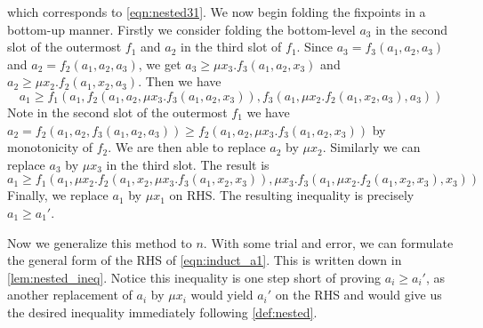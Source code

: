 which corresponds to \autoref{eqn:nested31}. We now begin folding the fixpoints in a bottom-up manner. Firstly we consider folding the bottom-level $a_3$ in the second slot of the outermost $f_1$ and $a_2$ in the third slot of $f_1$. Since $a_3 = f_3(a_1,a_2,a_3)$ and $a_2=f_2(a_1,a_2,a_3)$, we get $a_3 \geq \mu x_3. f_3(a_1,a_2,x_3)$ and $a_2\geq \mu x_2.f_2(a_1,x_2,a_3)$. Then we have
\begin{equation*}
    a_1 \geq f_1(a_1,f_2(a_1,a_2,\mu x_3.f_3(a_1,a_2,x_3)), f_3(a_1,\mu x_2.f_2(a_1,x_2,a_3),a_3))
\end{equation*}
Note in the second slot of the outermost $f_1$ we have $a_2 = f_2(a_1,a_2,f_3(a_1,a_2,a_3)) \geq f_2(a_1,a_2,\mu x_3.f_3(a_1,a_2,x_3))$ by monotonicity of $f_2$. We are then able to replace $a_2$ by $\mu x_2$. Similarly we can replace $a_3$ by $\mu x_3$ in the third slot. The result is
\begin{equation}
    \label{eqn:induct_a1}
    a_1 \geq f_1(a_1,\mu x_2.f_2(a_1,x_2,\mu x_3.f_3(a_1,x_2,x_3)), \mu x_3.f_3(a_1,\mu x_2.f_2(a_1,x_2,x_3),x_3))
\end{equation}
Finally, we replace $a_1$ by $\mu x_1$ on RHS. The resulting inequality is precisely $a_1 \geq a_1'$.

Now we generalize this method to $n$. With some trial and error, we can formulate the general form of the RHS of \autoref{eqn:induct_a1}. This is written down in \autoref{lem:nested_ineq}. Notice this inequality is one step short of proving $a_i \geq a_i'$, as another replacement of $a_i$ by $\mu x_i$ would yield $a_i'$ on the RHS and would give us the desired inequality immediately following \autoref{def:nested}.

